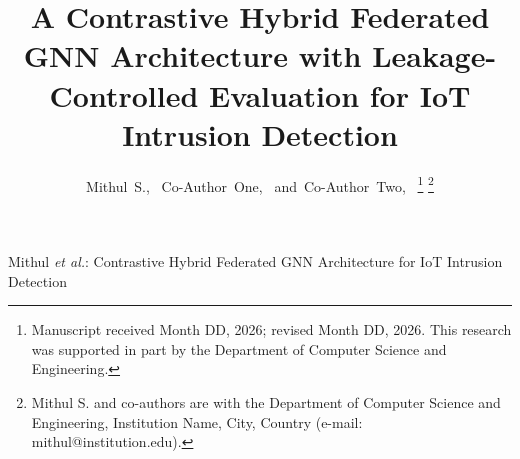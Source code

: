 \documentclass[journal,onecolumn]{IEEEtran}
\begin{document}
\title{A Contrastive Hybrid Federated GNN Architecture with Leakage-Controlled Evaluation for IoT Intrusion Detection}

\author{Mithul~S.,~
        Co-Author~One,~
        and~Co-Author~Two,~%
\thanks{Manuscript received Month DD, 2026; revised Month DD, 2026. This research was supported in part by the Department of Computer Science and Engineering.}%
\thanks{Mithul S. and co-authors are with the Department of Computer Science and Engineering, Institution Name, City, Country (e-mail: mithul@institution.edu).}%
}

%
{Mithul \MakeLowercase{\textit{et al.}}: Contrastive Hybrid Federated GNN Architecture for IoT Intrusion Detection}

\maketitle
\end{document}
